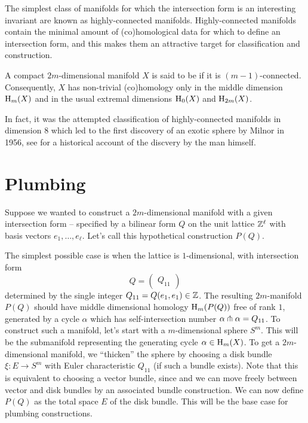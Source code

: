 The simplest class of manifolds for which the intersection form is an interesting invariant are known as highly-connected manifolds. Highly-connected manifolds contain the minimal amount of (co)homological data for which to define an intersection form, and this makes them an attractive target for classification and construction.

\begin{definition}
	A compact $2m$-dimensional manifold $X$ is said to be  if it is $(m-1)$-connected. Consequently, $X$ has non-trivial (co)homology only in the middle dimension $\operatorname{H}_m(X)$ and in the usual extremal dimensions $\operatorname{H}_0(X)$ and $\operatorname{H}_{2m}(X)$.
\end{definition}

\begin{remark}
	In fact, it was the attempted classification of highly-connected manifolds in dimension $8$ which led to the first discovery of an exotic sphere by Milnor in 1956, see \cite{milnor2000exotic} for a historical account of the discvery by the man himself.
\end{remark}

\section{Plumbing}

Suppose we wanted to construct a $2m$-dimensional manifold with a given intersection form -- specified by a bilinear form $Q$ on the unit lattice $\mathbb{Z}^\ell$ with basis vectors $e_1,\ldots, e_\ell$. Let's call this hypothetical construction $P(Q)$.

The simplest possible case is when the lattice is $1$-dimensional, with intersection form
\[
	Q = \begin{pmatrix} Q_{11}\end{pmatrix}
\]
determined by the single integer $Q_{11}=Q(e_1,e_1)\in \mathbb{Z}$.
The resulting $2m$-manifold $P(Q)$ should have middle dimensional homology $\operatorname{H}_m(P(Q))$ free of rank $1$, generated by a cycle $\alpha$ which has self-intersection number $\alpha\pitchfork \alpha = Q_{11}$. To construct such a manifold, let's start with a $m$-dimensional sphere $S^m$. This will be the submanifold representing the generating cycle $\alpha\in \operatorname{H}_m(X)$. To get a $2m$-dimensional manifold, we ``thicken'' the sphere by choosing a disk bundle $\xi : E \to S^m$ with Euler characteristic $Q_{11}$ (if such a bundle exists). Note that this is equivalent to choosing a vector bundle, since and we can move freely between vector and disk bundles by an associated bundle construction. We can now define $P(Q)$ as the total space $E$ of the disk bundle. This will be the base case for plumbing constructions.


